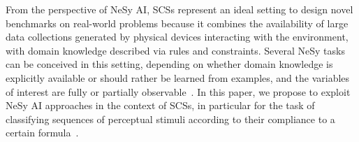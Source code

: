 From the perspective of NeSy AI, SCSs represent an ideal setting to design novel benchmarks on real-world problems because it combines the availability of large data collections generated by physical devices interacting with the environment, with domain knowledge described via rules and constraints. Several NeSy tasks can be conceived in this setting, depending on whether domain knowledge is explicitly available or should rather be learned from examples, and the variables of interest are fully or partially observable~\cite{carnevali2024neuro}.
%
In this paper, we propose to exploit NeSy AI approaches in the context of SCSs, in particular for the task of classifying sequences of perceptual stimuli according to their compliance to a certain \LTL formula~\cite{lorello2025neuro}.%

\fi

\iffalse
